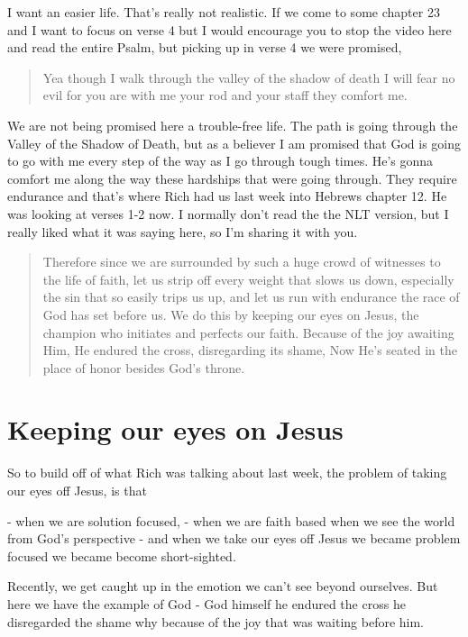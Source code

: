 \documentclass[11pt]{article} %
\begin{document}
I want an easier life. That's really not realistic. If we come to some chapter 23 and I want to focus on
verse 4 but I would encourage you to stop the video here and read the entire Psalm, but picking up
in verse 4 we were promised,

\begin{quote}
Yea though I walk through the valley of the shadow of death I will fear no evil for you are with me your
rod and your staff they comfort me.
\end{quote}

We are not being promised here a trouble-free life. The path is going through the Valley of the Shadow of Death,
but as a believer I am promised that God is going to go with me every step of the way as I go through tough
times. He's gonna comfort me along the way these hardships that were going through. They require endurance
and that's where Rich had us last week into Hebrews chapter 12. He was looking at verses 1-2 now. I normally
don't read the the NLT version, but I really liked what it was saying here, so I'm sharing it with you.

\begin{quote}
Therefore since we are surrounded by such a huge crowd of witnesses to the life of faith, let us strip off
every weight that slows us down, especially the sin that so easily trips us up, and let us run with endurance
the race of God has set before us. We do this by keeping our eyes on Jesus, the champion who initiates
and perfects our faith. Because of the joy awaiting Him, He endured the cross, disregarding its shame,
 Now He's seated in the place of honor besides God's throne.
\end{quote}

\section{Keeping our eyes on Jesus}

So to build off of what Rich was talking about last week, the problem of taking our eyes off Jesus, is that

- when we are solution focused,    
- when we are faith based when we see the world from God's perspective     
- and when we take our eyes off Jesus we became problem focused we became become short-sighted.

Recently, we get caught up in the emotion we can't see beyond ourselves. But here we have the example
of God - God himself he endured the cross he disregarded the shame why because of the joy that was
waiting before him.
\end{document}

